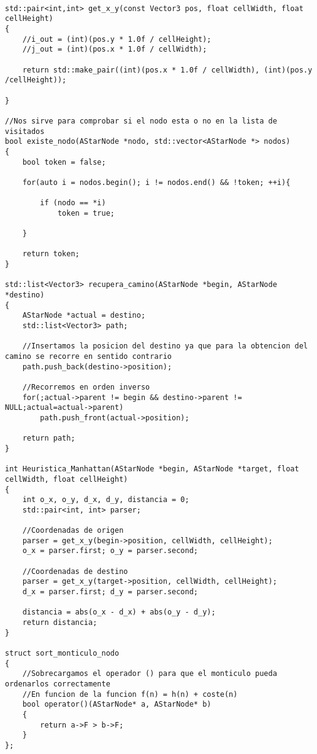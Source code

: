 

\begin{lstlisting}

std::pair<int,int> get_x_y(const Vector3 pos, float cellWidth, float cellHeight)
{
    //i_out = (int)(pos.y * 1.0f / cellHeight);
    //j_out = (int)(pos.x * 1.0f / cellWidth);

    return std::make_pair((int)(pos.x * 1.0f / cellWidth), (int)(pos.y /cellHeight));

}

//Nos sirve para comprobar si el nodo esta o no en la lista de visitados
bool existe_nodo(AStarNode *nodo, std::vector<AStarNode *> nodos)
{
    bool token = false;
    
    for(auto i = nodos.begin(); i != nodos.end() && !token; ++i){
        
        if (nodo == *i)
            token = true;
        
    }
    
    return token;
}

std::list<Vector3> recupera_camino(AStarNode *begin, AStarNode *destino)
{
    AStarNode *actual = destino;
    std::list<Vector3> path;

    //Insertamos la posicion del destino ya que para la obtencion del camino se recorre en sentido contrario
    path.push_back(destino->position);

    //Recorremos en orden inverso
    for(;actual->parent != begin && destino->parent != NULL;actual=actual->parent)
        path.push_front(actual->position);

    return path;
}

int Heuristica_Manhattan(AStarNode *begin, AStarNode *target, float cellWidth, float cellHeight)
{
    int o_x, o_y, d_x, d_y, distancia = 0;
    std::pair<int, int> parser;
    
    //Coordenadas de origen
    parser = get_x_y(begin->position, cellWidth, cellHeight);
    o_x = parser.first; o_y = parser.second;

    //Coordenadas de destino
    parser = get_x_y(target->position, cellWidth, cellHeight);
    d_x = parser.first; d_y = parser.second;

    distancia = abs(o_x - d_x) + abs(o_y - d_y);
    return distancia;
}

struct sort_monticulo_nodo
{
    //Sobrecargamos el operador () para que el monticulo pueda ordenarlos correctamente 
    //En funcion de la funcion f(n) = h(n) + coste(n) 
    bool operator()(AStarNode* a, AStarNode* b)
    {
        return a->F > b->F;
    }
};




\end{lstlisting}
